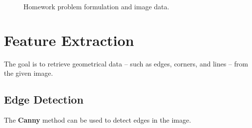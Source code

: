 \documentclass[12pt,a4paper]{article}
\begin{document}
\begin{figure}[H]
    \centering
    \quad
    \caption[Homework problem formulation and image data.]{Homework problem formulation and image data.}
    \label{fig:problem}
\end{figure}

\section{Feature Extraction}
\label{sec:featureExtraction}
The goal is to retrieve geometrical data -- such as edges, corners, and lines -- from the given image.

\subsection{Edge Detection}
\label{sec:edgeDetection}
The \textbf{Canny} method can be used to detect edges in the image.\\
\end{document}
